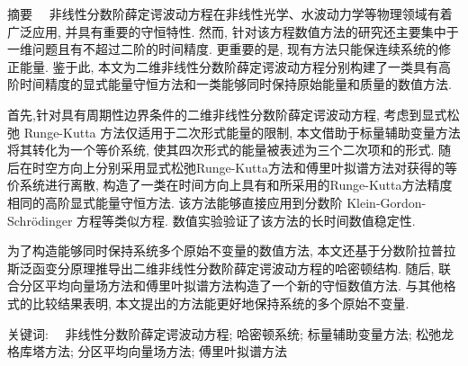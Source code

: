 
\begin{ChineseAbstract}[***]%
\item {\heiti 摘要\ \ }
非线性分数阶薛定谔波动方程在非线性光学、水波动力学等物理领域有着广泛应用, 并具有重要的守恒特性. 然而, 针对该方程数值方法的研究还主要集中于一维问题且有不超过二阶的时间精度. 更重要的是, 现有方法只能保连续系统的修正能量. 鉴于此, 本文为二维非线性分数阶薛定谔波动方程分别构建了一类具有高阶时间精度的显式能量守恒方法和一类能够同时保持原始能量和质量的数值方法.  

首先,针对具有周期性边界条件的二维非线性分数阶薛定谔波动方程, 考虑到显式松弛 Runge-Kutta 方法仅适用于二次形式能量的限制, 本文借助于标量辅助变量方法将其转化为一个等价系统, 使其四次形式的能量被表述为三个二次项和的形式. 随后在时空方向上分别采用显式松弛Runge-Kutta方法和傅里叶拟谱方法对获得的等价系统进行离散, 构造了一类在时间方向上具有和所采用的Runge-Kutta方法精度相同的高阶显式能量守恒方法. 该方法能够直接应用到分数阶 Klein-Gordon-Schr{\"o}dinger 方程等类似方程. 数值实验验证了该方法的长时间数值稳定性.

为了构造能够同时保持系统多个原始不变量的数值方法, 本文还基于分数阶拉普拉斯泛函变分原理推导出二维非线性分数阶薛定谔波动方程的哈密顿结构. 随后, 联合分区平均向量场方法和傅里叶拟谱方法构造了一个新的守恒数值方法. 与其他格式的比较结果表明, 本文提出的方法能更好地保持系统的多个原始不变量.


\item {\heiti 关键词:\ \ } 非线性分数阶薛定谔波动方程; 哈密顿系统; 标量辅助变量方法; 松弛龙格库塔方法; 分区平均向量场方法; 傅里叶拟谱方法
\end{ChineseAbstract}
